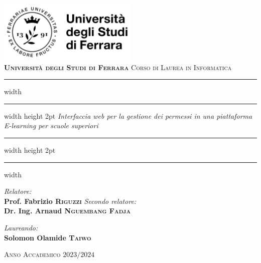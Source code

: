 \documentclass[a4paper, 12pt]{book}
\begin{document}

\begin{titlepage}
  \centering
  \vspace*{5mm}
  \includegraphics[width=0.5\textwidth]{../images/logo-unife-hires.png}\\
  \vspace*{1cm}
  \huge \textbf{\textsc{Università degli Studi di Ferrara}}
  \Large \textsc{Corso di Laurea in Informatica}

  \vspace*{2.5cm}
  \hrule width \hsize \kern 1mm \hrule width \hsize height 2pt
  \vspace*{10mm}
  \Huge \emph{\textnormal{Interfaccia web per la gestione dei permessi in una piattaforma E-learning per scuole superiori}}
  \vspace*{10mm}
  \hrule width \hsize height 2pt
  \vspace*{1mm}
  \hrule width \hsize \kern 1mm

  \vspace*{3.5cm}
  \begin{minipage}{0.45\textwidth}
    \begin{flushleft} \Large
      \emph{Relatore:}\\
      \Large \textbf{Prof. Fabrizio \textsc{Riguzzi}}
      \emph{Secondo relatore:}\\
      \Large \textbf{Dr. Ing. Arnaud \textsc{Nguembang Fadja}}
    \end{flushleft}
  \end{minipage}
  \begin{minipage}{0.5\textwidth}
    \begin{flushright} \Large
      \emph{Laureando:} \\
      \Large \textbf{Solomon Olamide \textsc{Taiwo}}
    \end{flushright}
  \end{minipage}

  \vfill %
  \Large \textsc{Anno Accademico $2023/2024$}
\end{titlepage}
\restoregeometry
\end{document}
